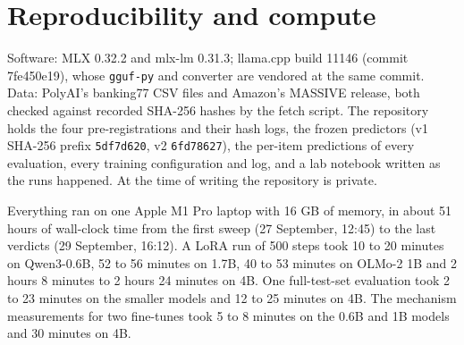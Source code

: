 \documentclass[11pt,letterpaper]{article}
\begin{document}
\section{Reproducibility and compute}
\label{app:repro}

Software: MLX 0.32.2 and mlx-lm 0.31.3; llama.cpp build 11146 (commit 7fe450e19), whose \texttt{gguf-py} and converter are vendored at the same commit. Data: PolyAI's banking77 CSV files and Amazon's MASSIVE release, both checked against recorded SHA-256 hashes by the fetch script. The repository holds the four pre-registrations and their hash logs, the frozen predictors (v1 SHA-256 prefix \texttt{5df7d620}, v2 \texttt{6fd78627}), the per-item predictions of every evaluation, every training configuration and log, and a lab notebook written as the runs happened. At the time of writing the repository is private.

Everything ran on one Apple M1 Pro laptop with 16 GB of memory, in about 51 hours of wall-clock time from the first sweep (27 September, 12:45) to the last verdicts (29 September, 16:12). A LoRA run of 500 steps took 10 to 20 minutes on Qwen3-0.6B, 52 to 56 minutes on 1.7B, 40 to 53 minutes on OLMo-2 1B and 2 hours 8 minutes to 2 hours 24 minutes on 4B. One full-test-set evaluation took 2 to 23 minutes on the smaller models and 12 to 25 minutes on 4B. The mechanism measurements for two fine-tunes took 5 to 8 minutes on the 0.6B and 1B models and 30 minutes on 4B.
\end{document}
